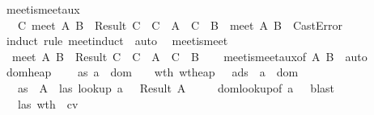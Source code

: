 \begin{isabellebody}
{\isafoldproof}\isadelimproof
\isanewline
\endisadelimproof
\isanewline
{}\isamarkupfalse \ meet{\isacharunderscore}is{\isacharunderscore}meet{\isacharunderscore}aux{\isacharcolon}\isanewline
\ \ {\isachardoublequoteopen}{\isacharparenleft}{\isasymexists}\ C{\isachardot}\ meet\ A\ B\ {\isacharequal}\ Result\ C\ {\isasymand}\ C\ {\isasymsqsubseteq}\ A\ {\isasymand}\ C\ {\isasymsqsubseteq}\ B{\isacharparenright}\ {\isasymor}\ meet\ A\ B\ {\isacharequal}\ CastError{\isachardoublequoteclose}\isanewline
\isadelimproof
\ \ \endisadelimproof
\isatagproof
{}\isamarkupfalse \ {\isacharparenleft}induct\ rule{\isacharcolon}\ meet{\isachardot}induct{\isacharparenright}\ \isamarkupfalse \ auto\ \isamarkupfalse \endisatagproof
{\isafoldproof}\isadelimproof
\isanewline
\endisadelimproof
\isanewline
{}\isamarkupfalse \ meet{\isacharunderscore}is{\isacharunderscore}meet{\isacharcolon}\isanewline
\ \ {\isachardoublequoteopen}meet\ A\ B\ {\isacharequal}\ Result\ C\ {\isasymLongrightarrow}\ C\ {\isasymsqsubseteq}\ A\ {\isasymand}\ C\ {\isasymsqsubseteq}\ B{\isachardoublequoteclose}\isanewline
\isadelimproof
\ \ \endisadelimproof
\isatagproof
{}\isamarkupfalse \ meet{\isacharunderscore}is{\isacharunderscore}meet{\isacharunderscore}aux{\isacharbrackleft}of\ A\ B{\isacharbrackright}\ \isamarkupfalse \ auto\ \isamarkupfalse \endisatagproof
{\isafoldproof}\isadelimproof
\isanewline
\endisadelimproof
\isanewline
{}\isamarkupfalse \ dom{\isacharunderscore}heap{\isacharcolon}\ \isanewline
\ \ \ as{\isacharcolon}\ {\isachardoublequoteopen}a\ {\isasymin}\ dom\ {\isasymSigma}\ {\isachardoublequoteclose}\ \ wth{\isacharcolon}\ {\isachardoublequoteopen}wt{\isacharunderscore}heap\ {\isasymSigma}\ {\isasymmu}\ ads{\isachardoublequoteclose}\ \ {\isachardoublequoteopen}a\ {\isasymin}\ dom\ {\isasymmu}{\isachardoublequoteclose}\isanewline
\isadelimproof
\endisadelimproof
\isatagproof
{}\isamarkupfalse \ {\isacharminus}\isanewline
\ \ \isamarkupfalse \ as\ \isamarkupfalse \ A\ \ las{\isacharcolon}\ {\isachardoublequoteopen}lookup\ a\ {\isasymSigma}\ {\isacharequal}\ Result\ A{\isachardoublequoteclose}\isanewline
\ \ \ \ \isamarkupfalse \ dom{\isacharunderscore}lookup{\isacharbrackleft}of\ a\ {\isasymSigma}{\isacharbrackright}\ \isamarkupfalse \ blast\isanewline
\ \ \isamarkupfalse \ las\ wth\ \isamarkupfalse \ cv\ \isanewline

\end{isabellebody}
